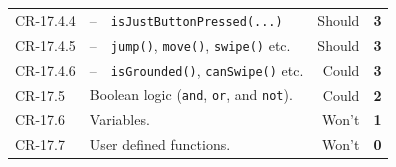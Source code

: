 \begin{center}
\begin{longtable}{lp{0.5cm}p{7cm}rc}
    \\
    CR-17.4.4
    & -- & \texttt{isJustButtonPressed(...)}
    & Should
    & \textbf{3}
    \\
    CR-17.4.5
    & -- & \texttt{jump()}, \texttt{move()}, \texttt{swipe()} etc.
    & Should
    & \textbf{3}
    \\
    CR-17.4.6
    & -- & \texttt{isGrounded()}, \texttt{canSwipe()} etc.
    & Could
    & \textbf{3}
    \\
    CR-17.5
    & \multicolumn{2}{l}{Boolean logic (\texttt{and}, \texttt{or}, and \texttt{not}).}
    & Could
    & \textbf{2}
    \\
    CR-17.6
    & \multicolumn{2}{l}{Variables.}
    & Won't
    & \textbf{1}
    \\
    CR-17.7
    & \multicolumn{2}{l}{User defined functions.}
    & Won't
    & \textbf{0}
    \\
    \bottomrule
  \end{longtable}
\end{center}